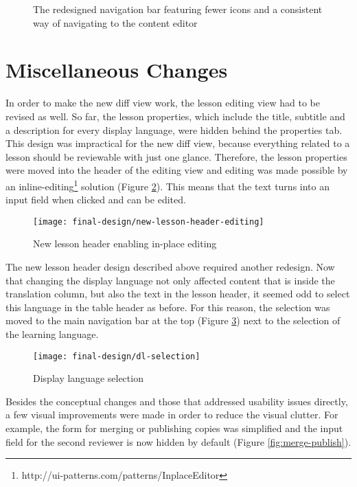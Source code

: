 \begin{figure}[h!]
 \centering
 \caption{The redesigned navigation bar featuring fewer icons and a consistent way of navigating to the content editor}
 \label{fig:redesigned-nav}
\end{figure}

\section{Miscellaneous Changes}
In order to make the new diff view work, the lesson editing view had to be revised as well. So far, the lesson properties, which include the title, subtitle and a description for every display language, were hidden behind the properties tab. This design was impractical for the new diff view, because everything related to a lesson should be reviewable with just one glance. Therefore, the lesson properties were moved into the header of the editing view and editing was made possible by an inline-editing\footnote{http://ui-patterns.com/patterns/InplaceEditor} solution (Figure \ref{fig:new-lesson-header}). This means that the text turns into an input field when clicked and can be edited.

\begin{figure}[h!]
 \centering
 \texttt{[image: final-design/new-lesson-header-editing]}
 \caption{New lesson header enabling in-place editing}
 \label{fig:new-lesson-header}
\end{figure}

The new lesson header design described above required another redesign. Now that changing the display language not only affected content that is inside the translation column, but also the text in the lesson header, it seemed odd to select this language in the table header as before. For this reason, the selection was moved to the main navigation bar at the top (Figure \ref{fig:dl-selection}) next to the selection of the learning language.

\begin{figure}[h!]
 \centering
 \texttt{[image: final-design/dl-selection]}
 \caption{Display language selection}
 \label{fig:dl-selection}
\end{figure}

Besides the conceptual changes and those that addressed usability issues directly, a few visual improvements were made in order to reduce the visual clutter. For example, the form for merging or publishing copies was simplified and the input field for the second reviewer is now hidden by default (Figure \ref{fig:merge-publish}).

